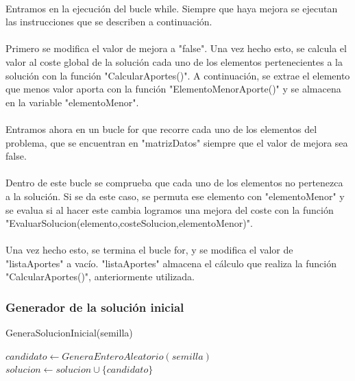 \documentclass{article}
\begin{document}
	\paragraph{}Entramos en la ejecución del bucle while. Siempre que haya mejora se ejecutan las instrucciones que se describen a continuación.
	
	\paragraph{}Primero se modifica el valor de mejora a "false". Una vez hecho esto, se calcula el valor al coste global de la solución cada uno de los elementos pertenecientes a la solución con la función "CalcularAportes()". A continuación, se extrae el elemento que menos valor aporta con la función "ElementoMenorAporte()" y se almacena en la variable "elementoMenor".
	
	\paragraph{}Entramos ahora en un bucle for que recorre cada uno de los elementos del problema, que se encuentran en "matrizDatos" siempre que el valor de mejora sea false.
	
	\paragraph{}Dentro de este bucle se comprueba que cada uno de los elementos no pertenezca a la solución. Si se da este caso, se permuta ese elemento con "elementoMenor" y se evalua si al hacer este cambia logramos una mejora del coste con la función "EvaluarSolucion(elemento,costeSolucion,elementoMenor)".
	
	\paragraph{}Una vez hecho esto, se termina el bucle for, y se modifica el valor de "listaAportes" a vacío. "listaAportes" almacena el cálculo que realiza la función "CalcularAportes()", anteriormente utilizada.

	\subsubsection{Generador de la solución inicial}
	\begin{algorithm}[H]
		\caption{GeneraSolucionInicial(semilla)}
		\begin{algorithmic}
			\STATE $candidato \leftarrow GeneraEnteroAleatorio(semilla)$
			\STATE $solucion \leftarrow solucion \cup \{candidato\}$
			\ENDIF
			\ENDWHILE
		\end{algorithmic}
	\end{algorithm}
\end{document}
